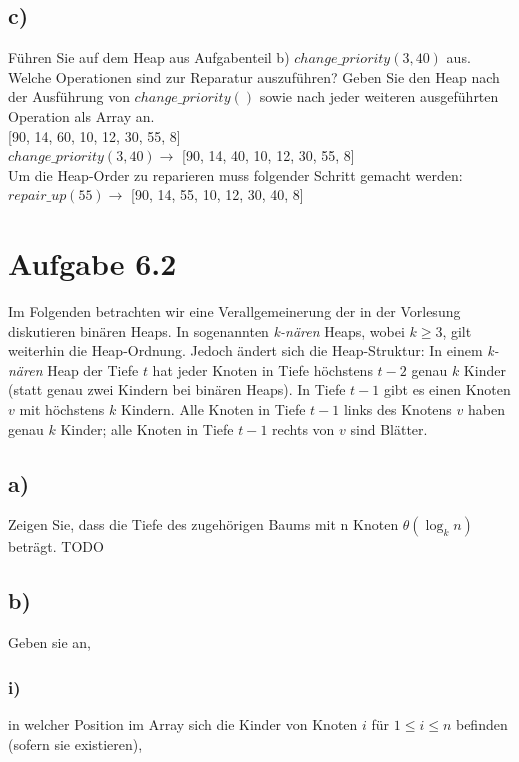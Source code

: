 \documentclass[a4paper]{article}
\begin{document}
\subsection*{c)}
Führen Sie auf dem Heap aus Aufgabenteil b) $change\_priority(3, 40)$ aus. Welche Operationen sind zur Reparatur auszuführen? Geben Sie den Heap nach der Ausführung von $change\_priority()$ sowie nach jeder weiteren ausgeführten Operation als Array an.\\

[90, 14, 60, 10, 12, 30, 55, 8]\\

$change\_priority(3, 40) \rightarrow$ [90, 14, 40, 10, 12, 30, 55, 8]\\

Um die Heap-Order zu reparieren muss folgender Schritt gemacht werden:\\

$repair\_up(55) \rightarrow$ [90, 14, 55, 10, 12, 30, 40, 8]


\break

\section*{Aufgabe 6.2}
Im Folgenden betrachten wir eine Verallgemeinerung der in der Vorlesung diskutieren binären Heaps. In sogenannten \textit{k-nären} Heaps, wobei $k \geq 3$, gilt weiterhin die Heap-Ordnung. Jedoch ändert sich die Heap-Struktur: In einem \textit{k-nären} Heap der Tiefe $t$ hat jeder Knoten in Tiefe höchstens $t - 2$ genau $k$ Kinder (statt genau zwei Kindern bei binären Heaps). In Tiefe $t - 1$ gibt es einen Knoten $v$ mit höchstens $k$ Kindern. Alle Knoten in Tiefe $t - 1$ links des Knotens $v$ haben genau $k$ Kinder; alle Knoten in Tiefe $t - 1$ rechts von $v$ sind Blätter.

\subsection*{a)}
Zeigen Sie, dass die Tiefe des zugehörigen Baums mit n Knoten $\theta(\log_k n)$ beträgt.
TODO

\subsection*{b)}
Geben sie an,
\subsubsection*{i)}
in welcher Position im Array sich die Kinder von Knoten $i$ für $1 \leq i \leq n$ befinden (sofern sie existieren),\\
\end{document}
